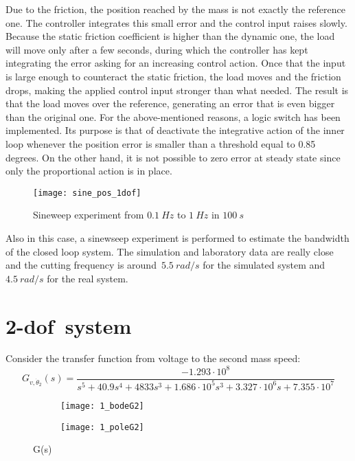Due to the friction, the position reached by the mass is not exactly the reference one. The controller integrates this small error and the control input raises slowly. Because the static friction coefficient is higher than the dynamic one, the load will move only after a few seconds, during which the controller has kept integrating the error asking for an increasing control action.
Once that the input is large enough to counteract the static friction, the load moves and the friction drops, making the applied control input stronger than what needed. The result is that the load moves over the reference, generating an error that is even bigger than the original one.
For the above-mentioned reasons, a logic switch has been implemented. Its purpose is that of deactivate the integrative action of the inner loop whenever the position error is smaller than a threshold equal to 0.85 degrees. On the other hand, it is not possible to zero error at steady state since only the proportional action is in place. \\

\begin{figure*}[h]
	\centering
	\texttt{[image: sine\_pos\_1dof]}
	\caption{Sineweep experiment from $0.1\ Hz$ to $1\ Hz$ in $100\ s$}
	\label{fig:sinesweep_pos_1dof}
\end{figure*}

Also in this case, a sinewseep experiment is performed to estimate the bandwidth of the closed loop system. The simulation and laboratory data are really close and the cutting frequency is around~$5.5\ rad/s$ for the simulated system and~$4.5\ rad/s$ for the real system.

\section{\acrshort{2-dof}\ system}
Consider the transfer function from voltage to the second mass speed:
\[
G_{v,\dot{\theta}_2}(s)=
\frac{-1.293 \cdot 10^{8}}{s^5+40.9s^{4}+4833s^{3}+1.686 \cdot 10^{5} s^{3}+3.327 \cdot 10^{6} s+7.355 \cdot 10^{7}}
\]

\begin{figure*}[h]
	\centering
	\begin{subfigure}{0.4\columnwidth}
		\texttt{[image: 1\_bodeG2]}
	\end{subfigure}
	\begin{subfigure}{0.4\columnwidth}
		\texttt{[image: 1\_poleG2]}
	\end{subfigure}
	\caption{G(s)}
	\label{fig:G(s)2dof}
\end{figure*}

